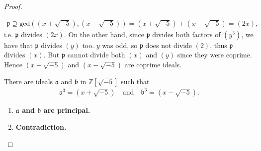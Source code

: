 \begin{proof}
\begin{enumerate}[resume]
\begin{align*}
            \mathfrak{p} \supseteq \mathrm{gcd}( (x + \sqrt{-5}),  (x - \sqrt{-5})) = (x + \sqrt{-5}) + (x - \sqrt{-5}) = (2x) \text{,}
        \end{align*}
        i.e. \(\mathfrak{p}\) divides \((2x)\). On the other hand, since \(\mathfrak{p}\) divides both factors of \((y^3)\), we have that \(\mathfrak{p}\) divides \((y)\) too. \(y\) was odd, so \(\mathfrak{p}\) does not divide \((2)\), thus \(\mathfrak{p}\) divides \((x)\). But \(\mathfrak{p}\) cannot divide both \((x)\) and \((y)\) since they were coprime. Hence \((x + \sqrt{-5})\) and \((x - \sqrt{-5})\) are coprime ideals.
    \end{enumerate}
    There are ideals \(\mathfrak{a}\) and \(\mathfrak{b}\) in \(\mathbb{Z}[\sqrt{-5}]\) such that
    \begin{align*}
        \mathfrak{a}^3 = (x + \sqrt{-5}) \quad \text{and} \quad \mathfrak{b}^3 = (x - \sqrt{-5}) \text{.}
    \end{align*}
    \begin{enumerate}[resume]
        \item \textbf{\(\mathfrak{a}\) and \(\mathfrak{b}\) are principal.}
        \item \textbf{Contradiction.}
    \end{enumerate}
\end{proof}